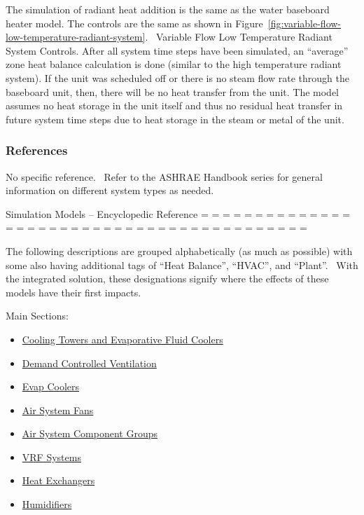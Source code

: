 The simulation of radiant heat addition is the same as the water baseboard heater model. The controls are the same as shown in Figure~\ref{fig:variable-flow-low-temperature-radiant-system}.~ Variable Flow Low Temperature Radiant System Controls. After all system time steps have been simulated, an ``average'' zone heat balance calculation is done (similar to the high temperature radiant system). If the unit was scheduled off or there is no steam flow rate through the baseboard unit, then, there will be no heat transfer from the unit. The model assumes no heat storage in the unit itself and thus no residual heat transfer in future system time steps due to heat storage in the steam or metal of the unit.

\subsubsection{References}\label{references-1-007}

No specific reference.~ Refer to the ASHRAE Handbook series for general information on different system types as needed.

 Simulation Models -- Encyclopedic Reference = = = = = = = = = = = = = = = = = = = = = = = = = = = = = = = = = = = = = = = = = =

The following descriptions are grouped alphabetically (as much as possible) with some also having additional tags of ``Heat Balance'', ``HVAC'', and ``Plant''.~ With the integrated solution, these designations signify where the effects of these models have their first impacts.

Main Sections:

\begin{itemize}
\tightlist
\item
  \protect\hyperlink{TowersAndCoolers}{Cooling Towers and Evaporative Fluid Coolers}
\item
  \protect\hyperlink{DCV}{Demand Controlled Ventilation}
\item
  \protect\hyperlink{EvapCoolers}{Evap Coolers}
\item
  \protect\hyperlink{Fans}{Air System Fans}
\item
  \protect\hyperlink{AirComponentGroups}{Air System Component Groups}
\item
  \protect\hyperlink{VRF}{VRF Systems}
\item
  \protect\hyperlink{HX}{Heat Exchangers}
\item
  \protect\hyperlink{Humidifiers}{Humidifiers} 
\end{itemize}
